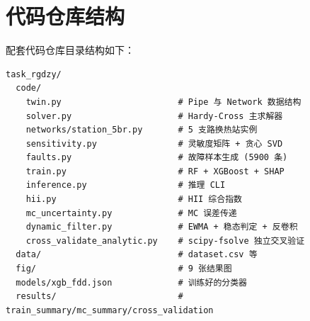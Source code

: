 \documentclass[11pt,a4paper]{ctexart}
\begin{document}
\section{代码仓库结构}\label{app:code}
配套代码仓库目录结构如下：
\begin{verbatim}
task_rgdzy/
  code/
    twin.py                       # Pipe 与 Network 数据结构
    solver.py                     # Hardy-Cross 主求解器
    networks/station_5br.py       # 5 支路换热站实例
    sensitivity.py                # 灵敏度矩阵 + 贪心 SVD
    faults.py                     # 故障样本生成 (5900 条)
    train.py                      # RF + XGBoost + SHAP
    inference.py                  # 推理 CLI
    hii.py                        # HII 综合指数
    mc_uncertainty.py             # MC 误差传递
    dynamic_filter.py             # EWMA + 稳态判定 + 反卷积
    cross_validate_analytic.py    # scipy-fsolve 独立交叉验证
  data/                           # dataset.csv 等
  fig/                            # 9 张结果图
  models/xgb_fdd.json             # 训练好的分类器
  results/                        # train_summary/mc_summary/cross_validation
\end{verbatim}
\end{document}
